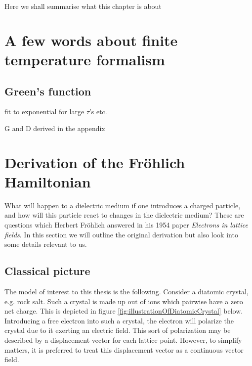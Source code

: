 \documentclass[12pt]{report}
\newcommand{\todo}[1]{{\leavevmode\color{todo}#1}}
\begin{document}
\todo{Here we shall summarise what this chapter is about}

\section{A few words about finite temperature formalism}

\subsection{Green's function}

\todo{fit to exponential  for large $ \tau $'s etc.}

\todo{G and D derived in the appendix}

\section{Derivation of the Fröhlich Hamiltonian}


What will happen to a dielectric medium if one introduces a charged particle, and how will this particle react to changes in the dielectric medium? These are questions which Herbert Fröhlich answered in his 1954 paper \textit{Electrons in lattice fields}\cite{electronsInLatticeFields}. In this section we will outline the original derivation but also look into some details relevant to us.

\subsection{Classical picture}

The model of interest to this thesis is the following. Consider a diatomic crystal, e.g. rock salt. Such a crystal is made up out of ions which pairwise have a zero net charge. This is depicted in figure \ref{fig:illustrationOfDiatomicCrystal} below. Introducing a free electron into such a crystal, the electron will polarize the crystal due to it exerting an electric field. This sort of polarization may be described by a displacement vector for each lattice point. However, to simplify matters, it is preferred to treat this displacement vector as a continuous vector field.
\end{document}
